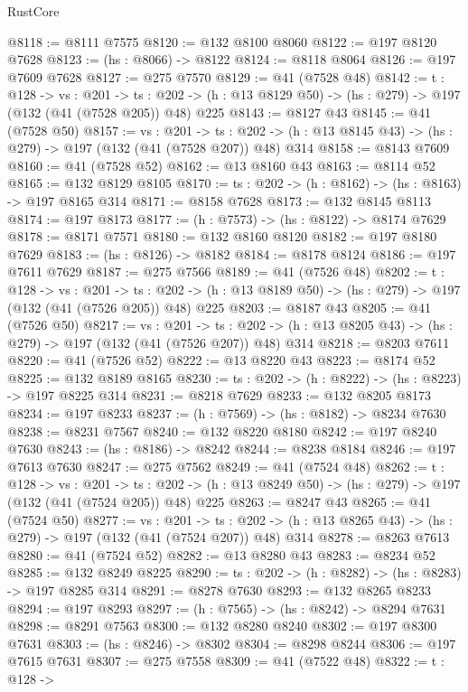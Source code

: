 \begin{lexlean}{RustCore}
\begin{coremodule}
@8118 := @8111 @7575
@8120 := @132 @8100 @8060
@8122 := @197 @8120 @7628
@8123 := (hs : @8066) -> @8122
@8124 := @8118 @8064
@8126 := @197 @7609 @7628
@8127 := @275 @7570
@8129 := @41 (@7528 @48)
@8142 := {t : @128} ->
  {vs : @201} ->
  {ts : @202} -> (h : @13 @8129 @50) -> (hs : @279) -> @197 (@132 (@41 (@7528 @205)) @48) @225
@8143 := @8127 @43
@8145 := @41 (@7528 @50)
@8157 := {vs : @201} ->
  {ts : @202} -> (h : @13 @8145 @43) -> (hs : @279) -> @197 (@132 (@41 (@7528 @207)) @48) @314
@8158 := @8143 @7609
@8160 := @41 (@7528 @52)
@8162 := @13 @8160 @43
@8163 := @8114 @52
@8165 := @132 @8129 @8105
@8170 := {ts : @202} -> (h : @8162) -> (hs : @8163) -> @197 @8165 @314
@8171 := @8158 @7628
@8173 := @132 @8145 @8113
@8174 := @197 @8173
@8177 := (h : @7573) -> (hs : @8122) -> @8174 @7629
@8178 := @8171 @7571
@8180 := @132 @8160 @8120
@8182 := @197 @8180 @7629
@8183 := (hs : @8126) -> @8182
@8184 := @8178 @8124
@8186 := @197 @7611 @7629
@8187 := @275 @7566
@8189 := @41 (@7526 @48)
@8202 := {t : @128} ->
  {vs : @201} ->
  {ts : @202} -> (h : @13 @8189 @50) -> (hs : @279) -> @197 (@132 (@41 (@7526 @205)) @48) @225
@8203 := @8187 @43
@8205 := @41 (@7526 @50)
@8217 := {vs : @201} ->
  {ts : @202} -> (h : @13 @8205 @43) -> (hs : @279) -> @197 (@132 (@41 (@7526 @207)) @48) @314
@8218 := @8203 @7611
@8220 := @41 (@7526 @52)
@8222 := @13 @8220 @43
@8223 := @8174 @52
@8225 := @132 @8189 @8165
@8230 := {ts : @202} -> (h : @8222) -> (hs : @8223) -> @197 @8225 @314
@8231 := @8218 @7629
@8233 := @132 @8205 @8173
@8234 := @197 @8233
@8237 := (h : @7569) -> (hs : @8182) -> @8234 @7630
@8238 := @8231 @7567
@8240 := @132 @8220 @8180
@8242 := @197 @8240 @7630
@8243 := (hs : @8186) -> @8242
@8244 := @8238 @8184
@8246 := @197 @7613 @7630
@8247 := @275 @7562
@8249 := @41 (@7524 @48)
@8262 := {t : @128} ->
  {vs : @201} ->
  {ts : @202} -> (h : @13 @8249 @50) -> (hs : @279) -> @197 (@132 (@41 (@7524 @205)) @48) @225
@8263 := @8247 @43
@8265 := @41 (@7524 @50)
@8277 := {vs : @201} ->
  {ts : @202} -> (h : @13 @8265 @43) -> (hs : @279) -> @197 (@132 (@41 (@7524 @207)) @48) @314
@8278 := @8263 @7613
@8280 := @41 (@7524 @52)
@8282 := @13 @8280 @43
@8283 := @8234 @52
@8285 := @132 @8249 @8225
@8290 := {ts : @202} -> (h : @8282) -> (hs : @8283) -> @197 @8285 @314
@8291 := @8278 @7630
@8293 := @132 @8265 @8233
@8294 := @197 @8293
@8297 := (h : @7565) -> (hs : @8242) -> @8294 @7631
@8298 := @8291 @7563
@8300 := @132 @8280 @8240
@8302 := @197 @8300 @7631
@8303 := (hs : @8246) -> @8302
@8304 := @8298 @8244
@8306 := @197 @7615 @7631
@8307 := @275 @7558
@8309 := @41 (@7522 @48)
@8322 := {t : @128} ->

\end{coremodule}
\end{lexlean}
